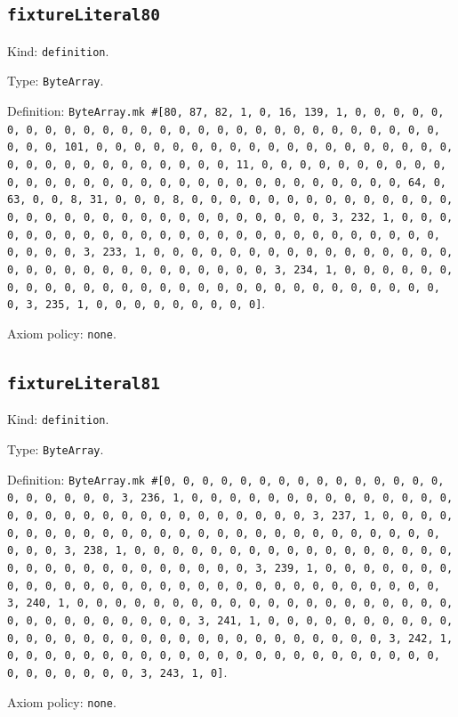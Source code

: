 \documentclass[11pt]{article}
\begin{document}
\subsection*{\texttt{fixtureLiteral80}}
\noindent Kind: \texttt{definition}.\par
\noindent Type: \texttt{ByteArray}.\par
\noindent Definition: \texttt{ByteArray.mk \#[80, 87, 82, 1, 0, 16, 139, 1, 0, 0, 0, 0, 0, 0, 0, 0, 0, 0, 0, 0, 0, 0, 0, 0, 0, 0, 0, 0, 0, 0, 0, 0, 0, 0, 0, 0, 0, 0, 0, 101, 0, 0, 0, 0, 0, 0, 0, 0, 0, 0, 0, 0, 0, 0, 0, 0, 0, 0, 0, 0, 0, 0, 0, 0, 0, 0, 0, 0, 0, 0, 0, 11, 0, 0, 0, 0, 0, 0, 0, 0, 0, 0, 0, 0, 0, 0, 0, 0, 0, 0, 0, 0, 0, 0, 0, 0, 0, 0, 0, 0, 0, 0, 0, 64, 0, 63, 0, 0, 8, 31, 0, 0, 0, 8, 0, 0, 0, 0, 0, 0, 0, 0, 0, 0, 0, 0, 0, 0, 0, 0, 0, 0, 0, 0, 0, 0, 0, 0, 0, 0, 0, 0, 0, 0, 0, 3, 232, 1, 0, 0, 0, 0, 0, 0, 0, 0, 0, 0, 0, 0, 0, 0, 0, 0, 0, 0, 0, 0, 0, 0, 0, 0, 0, 0, 0, 0, 0, 0, 3, 233, 1, 0, 0, 0, 0, 0, 0, 0, 0, 0, 0, 0, 0, 0, 0, 0, 0, 0, 0, 0, 0, 0, 0, 0, 0, 0, 0, 0, 0, 0, 0, 3, 234, 1, 0, 0, 0, 0, 0, 0, 0, 0, 0, 0, 0, 0, 0, 0, 0, 0, 0, 0, 0, 0, 0, 0, 0, 0, 0, 0, 0, 0, 0, 0, 3, 235, 1, 0, 0, 0, 0, 0, 0, 0, 0, 0]}.\par
\noindent Axiom policy: \texttt{none}.\par
\subsection*{\texttt{fixtureLiteral81}}
\noindent Kind: \texttt{definition}.\par
\noindent Type: \texttt{ByteArray}.\par
\noindent Definition: \texttt{ByteArray.mk \#[0, 0, 0, 0, 0, 0, 0, 0, 0, 0, 0, 0, 0, 0, 0, 0, 0, 0, 0, 0, 0, 3, 236, 1, 0, 0, 0, 0, 0, 0, 0, 0, 0, 0, 0, 0, 0, 0, 0, 0, 0, 0, 0, 0, 0, 0, 0, 0, 0, 0, 0, 0, 0, 0, 3, 237, 1, 0, 0, 0, 0, 0, 0, 0, 0, 0, 0, 0, 0, 0, 0, 0, 0, 0, 0, 0, 0, 0, 0, 0, 0, 0, 0, 0, 0, 0, 0, 3, 238, 1, 0, 0, 0, 0, 0, 0, 0, 0, 0, 0, 0, 0, 0, 0, 0, 0, 0, 0, 0, 0, 0, 0, 0, 0, 0, 0, 0, 0, 0, 0, 3, 239, 1, 0, 0, 0, 0, 0, 0, 0, 0, 0, 0, 0, 0, 0, 0, 0, 0, 0, 0, 0, 0, 0, 0, 0, 0, 0, 0, 0, 0, 0, 0, 3, 240, 1, 0, 0, 0, 0, 0, 0, 0, 0, 0, 0, 0, 0, 0, 0, 0, 0, 0, 0, 0, 0, 0, 0, 0, 0, 0, 0, 0, 0, 0, 0, 3, 241, 1, 0, 0, 0, 0, 0, 0, 0, 0, 0, 0, 0, 0, 0, 0, 0, 0, 0, 0, 0, 0, 0, 0, 0, 0, 0, 0, 0, 0, 0, 0, 3, 242, 1, 0, 0, 0, 0, 0, 0, 0, 0, 0, 0, 0, 0, 0, 0, 0, 0, 0, 0, 0, 0, 0, 0, 0, 0, 0, 0, 0, 0, 0, 0, 3, 243, 1, 0]}.\par
\noindent Axiom policy: \texttt{none}.\par
\end{document}
